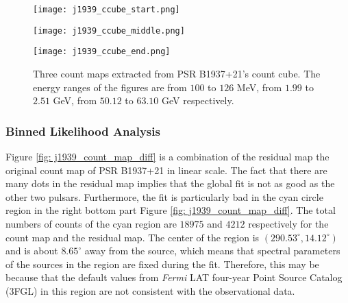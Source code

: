 \documentclass[a4paper, 12pt]{report}
\newcommand{\question}[1]{
  $<$\textbf{question}$>$#1$<$\textbf{/question}$>$
}
\begin{document}
        \begin{figure}[!htp]
          \begin{minipage}{0.32\textwidth}
            \begin{center} 
              \texttt{[image: j1939\_ccube\_start.png]}
            \end{center}
          \end{minipage}
          \begin{minipage}{0.32\textwidth}
            \begin{center}
              \texttt{[image: j1939\_ccube\_middle.png]}
            \end{center}
          \end{minipage}
          \begin{minipage}{0.32\textwidth}
            \begin{center}
            \texttt{[image: j1939\_ccube\_end.png]}
            \end{center}
          \end{minipage}
          \caption[Three count maps extracted from PSR B1937+21's count cube.]
            {Three count maps extracted from PSR B1937+21's count cube. The energy ranges 
            of the figures are from $100$ to $126$ MeV, from $1.99$ to $2.51$ GeV, from $50.12$ 
            to $63.10$ GeV respectively.}
          \label{fig: j1939_count_cube}
        \end{figure}

      \subsubsection{Binned Likelihood Analysis}
        Figure \ref{fig: j1939_count_map_diff} is a combination of the residual map the 
        original count map of PSR B1937+21 in linear scale. The fact that there are many 
        dots in the residual map implies that the global fit is not as good as the 
        other two pulsars. Furthermore, the fit is particularly bad in the cyan circle 
        region in the right bottom part Figure \ref{fig: j1939_count_map_diff}. 
        The total numbers of counts of the cyan region are $18975$ and $4212$ respectively 
        for the count map and the residual map. The center of the region is 
        $\left(290.53^{\circ}, 14.12^{\circ}\right)$ and is about $8.65^{\circ}$ away from 
        the source, which means that spectral parameters of the sources in the region are 
        fixed during the fit. Therefore, this may be because that the default values from 
        \textit{Fermi} LAT four-year Point Source Catalog (3FGL) in this region 
        are not consistent with the observational data. 
\end{document}
